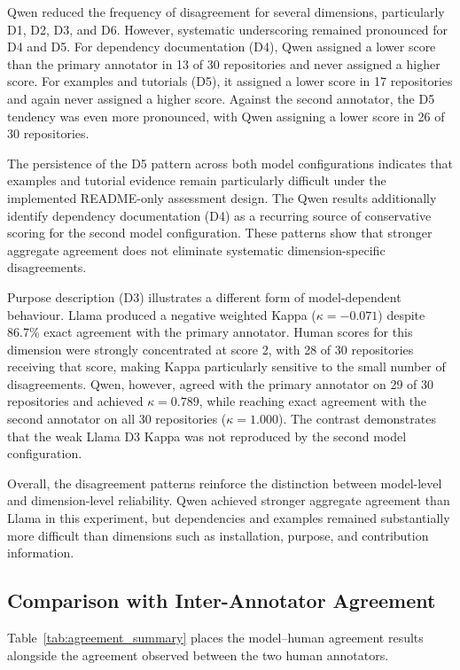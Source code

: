 Qwen reduced the frequency of disagreement for several dimensions,
particularly D1, D2, D3, and D6. However, systematic underscoring
remained pronounced for D4 and D5. For dependency documentation
(D4), Qwen assigned a lower score than the primary annotator in
13 of 30 repositories and never assigned a higher score. For examples
and tutorials (D5), it assigned a lower score in 17 repositories and
again never assigned a higher score. Against the second annotator,
the D5 tendency was even more pronounced, with Qwen assigning a lower
score in 26 of 30 repositories.

The persistence of the D5 pattern across both model configurations
indicates that examples and tutorial evidence remain particularly
difficult under the implemented README-only assessment design.
The Qwen results additionally identify dependency documentation
(D4) as a recurring source of conservative scoring for the second
model configuration. These patterns show that stronger aggregate
agreement does not eliminate systematic dimension-specific
disagreements.

Purpose description (D3) illustrates a different form of
model-dependent behaviour. Llama produced a negative weighted Kappa
($\kappa=-0.071$) despite 86.7\% exact agreement with the primary
annotator. Human scores for this dimension were strongly concentrated
at score 2, with 28 of 30 repositories receiving that score, making
Kappa particularly sensitive to the small number of disagreements.
Qwen, however, agreed with the primary annotator on 29 of 30
repositories and achieved $\kappa=0.789$, while reaching exact
agreement with the second annotator on all 30 repositories
($\kappa=1.000$). The contrast demonstrates that the weak Llama D3
Kappa was not reproduced by the second model configuration.

Overall, the disagreement patterns reinforce the distinction between
model-level and dimension-level reliability. Qwen achieved stronger
aggregate agreement than Llama in this experiment, but dependencies
and examples remained substantially more difficult than dimensions
such as installation, purpose, and contribution information.

\subsection{Comparison with Inter-Annotator Agreement}

Table~\ref{tab:agreement_summary} places the model--human agreement
results alongside the agreement observed between the two human
annotators.

